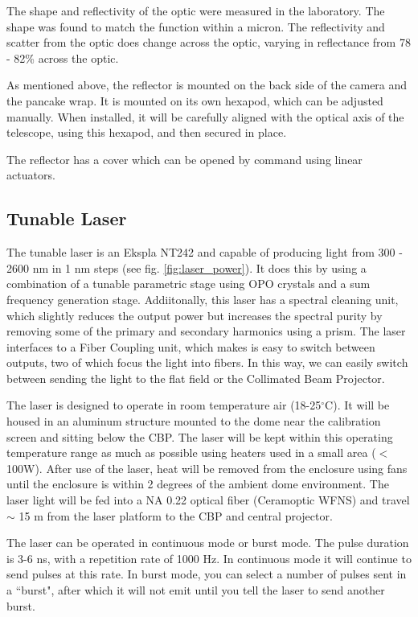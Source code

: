 \documentclass[SE,authoryear,toc]{article}
\begin{document}
\begin{table}[|||]
The shape and reflectivity of the optic were measured in the laboratory. The shape was found to match the function within a micron. The reflectivity and scatter from the optic does change across the optic, varying in reflectance from 78 - 82\% across the optic.

As mentioned above, the reflector is mounted on the back side of the camera and the pancake wrap. It is mounted on its own hexapod, which can be adjusted manually. When installed, it will be carefully aligned with the optical axis of the telescope, using this hexapod, and then secured in place.

The reflector has a cover which can be opened by command using linear actuators. 

\subsection{Tunable Laser}
The tunable laser is an Ekspla NT242 and capable of producing light from 300 - 2600 nm in 1 nm steps (see fig. \ref{fig:laser_power}). It does this by using a combination of a tunable parametric stage using OPO crystals and a sum frequency generation stage. 
Addiitonally, this laser has a spectral cleaning unit, which slightly reduces the output power but increases the spectral purity by removing some of the primary and secondary harmonics using a prism. The laser interfaces to a Fiber Coupling unit, which makes is easy to switch between outputs, two of which focus the light into fibers. 
In this way, we can easily switch between sending the light to the flat field or the Collimated Beam Projector. 

The laser is designed to operate in room temperature air (18-25$^{\circ}$C). 
It will be housed in an aluminum structure mounted to the dome near the calibration screen and sitting below the CBP. 
The laser will be kept within this operating temperature range as much as possible using heaters used in a small area ($<$100W). After use of the laser, heat will be removed from the enclosure using fans until the enclosure is within 2 degrees of the ambient dome environment.
The laser light will be fed into a NA 0.22 optical fiber (Ceramoptic WFNS) and travel $\sim$ 15 m from the laser platform to the CBP and central projector. 

The laser can be operated in continuous mode or burst mode. 
The pulse duration is 3-6 ns, with a repetition rate of 1000 Hz. 
In continuous mode it will continue to send pulses at this rate. 
In burst mode, you can select a number of pulses sent in a ``burst", after which it will not emit until you tell the laser to send another burst.


\end{table}
\end{document}

